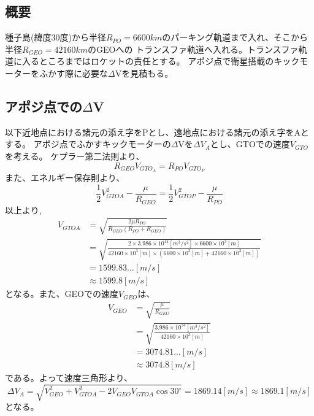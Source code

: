 \documentclass[15pt,uplatex,dvipdfmx]{jsarticle}
\begin{document}
\subsection{概要}
種子島(緯度30度)から半径$R_{PO}=6600km$のパーキング軌道まで入れ、そこから半径$R_{GEO}=42160km$のGEOへの
トランスファ軌道へ入れる。トランスファ軌道に入るところまではロケットの責任とする。
アポジ点で衛星搭載のキックモーターをふかす際に必要な$\Delta$Vを見積もる。
\subsection{アポジ点での$\Delta$V}
以下近地点における諸元の添え字をPとし、遠地点における諸元の添え字をAとする。
アポジ点でふかすキックモーターの$\Delta$Vを${\Delta}V_A$とし、GTOでの速度$V_{GTO}$を考える。
ケプラー第二法則より、
\begin{equation}
  R_{GEO}V_{GTO_A}=R_{PO}V_{GTO_P}
\end{equation}
また、エネルギー保存則より、
\begin{equation}
  \frac{1}{2} V_{GTOA}^2 - \frac{\mu}{R_{GEO}}
  =  \frac{1}{2} V_{GTOP}^2 - \frac{\mu}{R_{PO}}
\end{equation}
以上より,
\begin{align*}
  V_{GTOA} & = \sqrt{\frac{2\mu R_{PO}}{R_{GEO}(R_{PO}+R_{GEO})}} \\
           & = \sqrt{\frac{2\times3.986\times10^{14}[m^3/s^2]\times6600\times10^3[m]}
           {42160\times10^3[m]\times(6600\times10^3[m]+42160\times10^3[m])}} \\
           & = 1599.83...[m/s] \\
           & \approx 1599.8[m/s]
\end{align*}
となる。また、GEOでの速度$V_{GEO}$は、
\begin{align*}
  V_{GEO} &= \sqrt{\frac{\mu}{R_{GEO}}} \\
          &= \sqrt{\frac{3.986\times10^14[m^3/s^2]}{42160\times10^3[m]}} \\
          &= 3074.81...[m/s] \\
          & \approx 3074.8[m/s]
\end{align*}
である。よって速度三角形より、
\begin{equation}
  {\Delta}V_A = \sqrt{V_{GEO}^2+V_{GTOA}^2-2V_{GEO}V_{GTOA}\cos{30^ \circ }}
              = 1869.14[m/s]
               \approx{1869.1}[m/s]
\end{equation}
となる。
\end{document}

